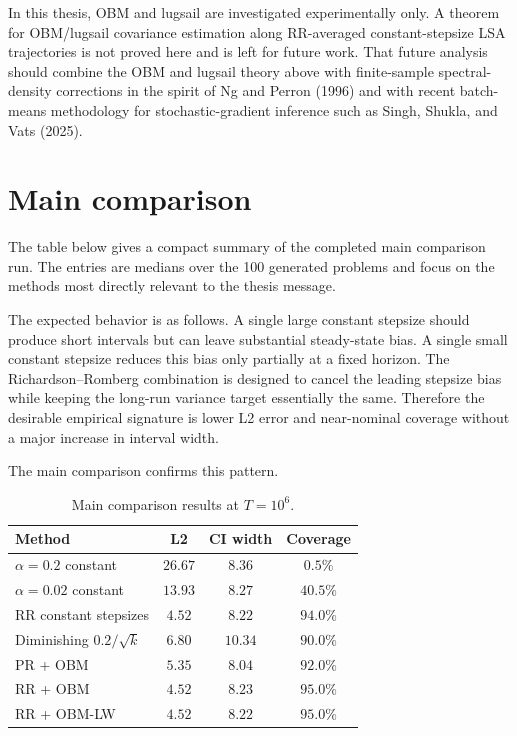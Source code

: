 In this thesis, OBM and lugsail are investigated experimentally only. A
theorem for OBM/lugsail covariance estimation along RR-averaged
constant-stepsize LSA trajectories is not proved here and is left for future
work. That future analysis should combine the OBM and lugsail theory above
with finite-sample spectral-density corrections in the spirit of Ng and
Perron (1996) and with recent batch-means methodology for stochastic-gradient
inference such as Singh, Shukla, and Vats (2025).

\section{Main comparison}

The table below gives a compact summary of the completed main comparison
run. The entries are medians over the 100 generated problems and focus on
the methods most directly relevant to the thesis message.

The expected behavior is as follows. A single large constant stepsize should
produce short intervals but can leave substantial steady-state bias. A single
small constant stepsize reduces this bias only partially at a fixed horizon.
The Richardson--Romberg combination is designed to cancel the leading
stepsize bias while keeping the long-run variance target essentially the
same. Therefore the desirable empirical signature is lower L2 error and
near-nominal coverage without a major increase in interval width.

The main comparison confirms this pattern.

\begin{table}[htbp]
\caption{Main comparison results at $T=10^6$.}
\centering
\begin{tabular}{lccc}
\toprule
\textbf{Method} & \textbf{L2} & \textbf{CI width} & \textbf{Coverage} \\
\midrule
$\alpha=0.2$ constant & $26.67$ & $8.36$ & $0.5\%$ \\
$\alpha=0.02$ constant & $13.93$ & $8.27$ & $40.5\%$ \\
RR constant stepsizes & $4.52$ & $8.22$ & $94.0\%$ \\
Diminishing $0.2/\sqrt{k}$ & $6.80$ & $10.34$ & $90.0\%$ \\
PR + OBM & $5.35$ & $8.04$ & $92.0\%$ \\
RR + OBM & $4.52$ & $8.23$ & $95.0\%$ \\
RR + OBM-LW & $4.52$ & $8.22$ & $95.0\%$ \\
\bottomrule
\end{tabular}
\end{table}

